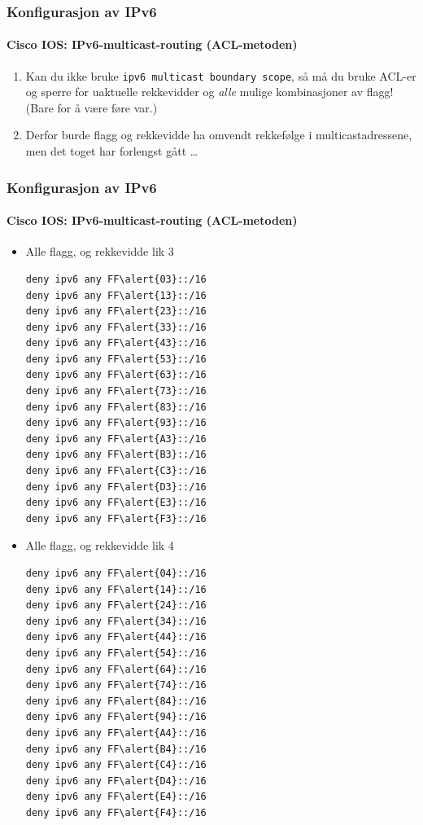 \begin{frame}
  \frametitle{Konfigurasjon av IPv6}
  \framesubtitle{Cisco IOS: IPv6-multicast-routing (ACL-metoden)}
  \begin{enumerate}
  \item Kan du ikke bruke \texttt{ipv6 multicast boundary scope}, så
    må du bruke ACL-er og sperre for uaktuelle rekkevidder og
    \textit{alle\/} mulige kombinasjoner av flagg! (Bare for å være
    føre var.)
  \item Derfor burde flagg og rekkevidde ha omvendt rekkefølge i
    multicastadressene, men det toget har forlengst gått \dots
  \end{enumerate}
\end{frame}

\begin{frame}[fragile]
  \frametitle{Konfigurasjon av IPv6}
  \framesubtitle{Cisco IOS: IPv6-multicast-routing (ACL-metoden)}
  \begin{multicols}{2}
    \begin{itemize}
    \item Alle flagg, og rekkevidde lik 3
\begin{Verbatim}[commandchars=\\\{\},fontsize=\scriptsize]
deny ipv6 any FF\alert{03}::/16
deny ipv6 any FF\alert{13}::/16
deny ipv6 any FF\alert{23}::/16
deny ipv6 any FF\alert{33}::/16
deny ipv6 any FF\alert{43}::/16
deny ipv6 any FF\alert{53}::/16
deny ipv6 any FF\alert{63}::/16
deny ipv6 any FF\alert{73}::/16
deny ipv6 any FF\alert{83}::/16
deny ipv6 any FF\alert{93}::/16
deny ipv6 any FF\alert{A3}::/16
deny ipv6 any FF\alert{B3}::/16
deny ipv6 any FF\alert{C3}::/16
deny ipv6 any FF\alert{D3}::/16
deny ipv6 any FF\alert{E3}::/16
deny ipv6 any FF\alert{F3}::/16
\end{Verbatim}
    \item Alle flagg, og rekkevidde lik 4
\begin{Verbatim}[commandchars=\\\{\},fontsize=\scriptsize]
deny ipv6 any FF\alert{04}::/16
deny ipv6 any FF\alert{14}::/16
deny ipv6 any FF\alert{24}::/16
deny ipv6 any FF\alert{34}::/16
deny ipv6 any FF\alert{44}::/16
deny ipv6 any FF\alert{54}::/16
deny ipv6 any FF\alert{64}::/16
deny ipv6 any FF\alert{74}::/16
deny ipv6 any FF\alert{84}::/16
deny ipv6 any FF\alert{94}::/16
deny ipv6 any FF\alert{A4}::/16
deny ipv6 any FF\alert{B4}::/16
deny ipv6 any FF\alert{C4}::/16
deny ipv6 any FF\alert{D4}::/16
deny ipv6 any FF\alert{E4}::/16
deny ipv6 any FF\alert{F4}::/16
\end{Verbatim}
    \end{itemize}
  \end{multicols}
\end{frame}


